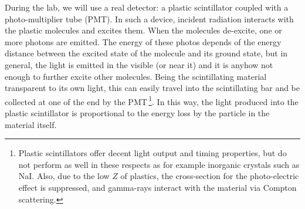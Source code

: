 \documentclass[a4,11pt, notitlepage]{article}
\begin{document}
During the lab, we will use a real detector: a plastic scintillator coupled with a photo-multiplier tube (PMT). 
In such a device, incident radiation interacts with the plastic molecules and excites them. 
%
%
When the molecules de-excite, one or more photons are emitted. The energy of these photos depends of the energy distance between the excited state of the molecule and its ground state, but in general, the light is emitted in the visible (or near it) and it is anyhow not enough to further excite other molecules. 
Being the scintillating material transparent to its own light, this can easily travel into the scintillating bar and be collected at one of the end by the PMT\,\footnote{
Plastic scintillators offer decent light output and timing properties, but do
not perform as well in these respects as for example inorganic crystals such as
NaI. Also, due to the low $Z$ of plastics, the cross-section for the
photo-electric effect is suppressed, and gamma-rays interact with the material
via Compton scattering.}. 
In this way, the light produced into the plastic scintillator is proportional to the energy loss by the particle in the material itself. 
\end{document}

